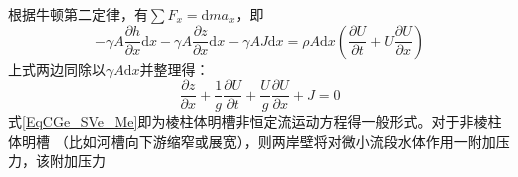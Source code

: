                                                         根据牛顿第二定律，有$\sum F_{x}=\mathrm{d}ma_{x}$，即
                                                        \begin{equation}
                                                          -\gamma A\frac{\partial h}{\partial x}\mathrm{d}x
                                                          -\gamma A\frac{\partial z}{\partial x}\mathrm{d}x
                                                          -\gamma AJ\mathrm{d}x
                                                          =
                                                          \rho A\mathrm{d}x
                                                          \left(
                                                            \frac{\partial U}{\partial t}
                                                            +
                                                            U
                                                            \frac{\partial U}{\partial x}
                                                          \right)
                                                        \end{equation}
                                                        上式两边同除以$\gamma A\mathrm{d}x$并整理得：
                                                        \begin{equation}
                                                          \frac{\partial z}{\partial x}
                                                          +
                                                          \frac{1}{g}
                                                          \frac{\partial U}{\partial t}
                                                          +
                                                          \frac{U}{g}
                                                          \frac{\partial U}{\partial x}
                                                          +
                                                          J
                                                          =
                                                          0
                                                          \label{EqCGe_SVe_Me}
                                                        \end{equation}
                                                        式\eqref{EqCGe_SVe_Me}即为棱柱体明槽非恒定流运动方程得一般形式。对于非棱柱体明槽
                                                        （比如河槽向下游缩窄或展宽），则两岸壁将对微小流段水体作用一附加压力，该附加压力
